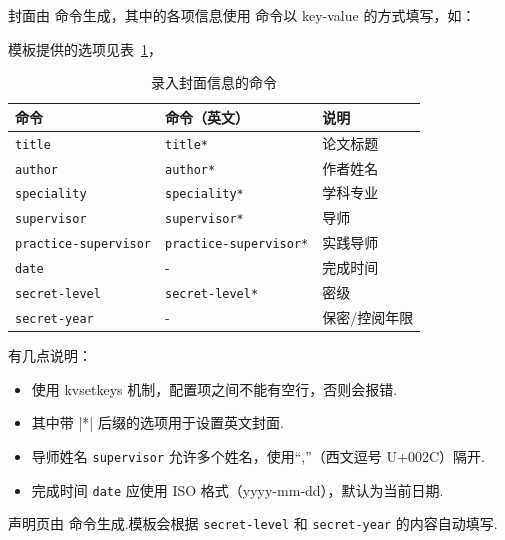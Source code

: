 \documentclass[a4paper]{ltxdoc}
\DeclareRobustCommand\pkg{\textsf}
\DeclareRobustCommand\opt{\texttt}
\begin{document}
\DescribeMacro{\maketitle}
封面由  命令生成，其中的各项信息使用  命令以
key-value 的方式填写，如：
\begin{latex}
\end{latex}
模板提供的选项见表~\ref{tab:covercmds}，
\begin{table}[htb]
  \centering\small
  \caption{录入封面信息的命令}
  \label{tab:covercmds}
  \begin{tabular}{lll}
    \toprule
    命令               & 命令（英文）        & 说明          \\
    \midrule
    \opt{title}        & \opt{title*}        & 论文标题      \\
    \opt{author}       & \opt{author*}       & 作者姓名      \\
    \opt{speciality}   & \opt{speciality*}   & 学科专业      \\
    \opt{supervisor}   & \opt{supervisor*}   & 导师      \\
    \opt{practice-supervisor} & \opt{practice-supervisor*} & 实践导师 \\
    \opt{date}         & -                   & 完成时间      \\
    \opt{secret-level} & \opt{secret-level*} & 密级          \\
    \opt{secret-year}  & -                   & 保密/控阅年限 \\
    \bottomrule
  \end{tabular}
\end{table}

有几点说明：
\begin{itemize}
  \item {} 使用 \pkg{kvsetkeys} 机制，配置项之间不能有空行，否则会报错.
  \item 其中带 |*| 后缀的选项用于设置英文封面.
  \item 导师姓名 \opt{supervisor} 允许多个姓名，使用“,”（西文逗号 U+002C）隔开.
  \item 完成时间 \opt{date} 应使用 ISO 格式（yyyy-mm-dd），默认为当前日期.
\end{itemize}

\DescribeMacro{\copyrightpage}
声明页由  命令生成.模板会根据 \opt{secret-level} 和
\opt{secret-year} 的内容自动填写.
\end{document}
